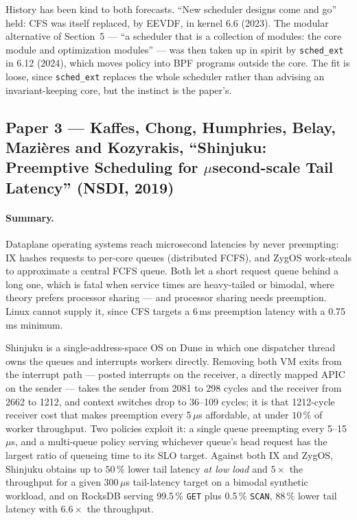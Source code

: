 History has been kind to both forecasts. ``New scheduler designs come and go'' held:
CFS was itself replaced, by EEVDF, in kernel 6.6 (2023). The modular alternative of
Section~5 --- ``a scheduler that is a collection of modules: the core module and
optimization modules'' --- was then taken up in spirit by \texttt{sched\_ext} in 6.12
(2024), which moves policy into BPF programs outside the core. The fit is loose, since
\texttt{sched\_ext} replaces the whole scheduler rather than advising an
invariant-keeping core, but the instinct is the paper's.

\subsection*{Paper 3 --- Kaffes, Chong, Humphries, Belay, Mazi\`eres and Kozyrakis,
``Shinjuku: Preemptive Scheduling for $\mu$second-scale Tail Latency'' (NSDI, 2019)}

\paragraph{Summary.}
Dataplane operating systems reach microsecond latencies by never preempting: IX hashes
requests to per-core queues (distributed FCFS), and ZygOS work-steals to approximate a
central FCFS queue. Both let a short request queue behind a long one, which is fatal
when service times are heavy-tailed or bimodal, where theory prefers processor sharing
--- and processor sharing needs preemption. Linux cannot supply it, since CFS targets a
6\,ms preemption latency with a 0.75\,ms minimum.

Shinjuku is a single-address-space OS on Dune in which one dispatcher thread owns the
queues and interrupts workers directly. Removing both VM exits from the interrupt path
--- posted
interrupts on the receiver, a directly mapped APIC on the sender --- takes the sender
from 2081 to 298 cycles and the receiver from 2662 to 1212, and context switches drop to
36--109 cycles; it is that 1212-cycle receiver cost that makes preemption every
5\,$\mu$s affordable, at under $10\,\%$ of worker throughput. Two policies exploit it: a
single queue preempting every 5--15\,$\mu$s, and a multi-queue policy serving whichever
queue's head request has the largest ratio of queueing time to its SLO target. Against
both IX and ZygOS, Shinjuku obtains up to $50\,\%$ lower tail latency \emph{at low load}
and $5\times$ the throughput for a given 300\,$\mu$s tail-latency target on a bimodal
synthetic workload, and on RocksDB serving 99.5\,\% \texttt{GET} plus 0.5\,\%
\texttt{SCAN}, $88\,\%$ lower tail latency with $6.6\times$ the throughput.

